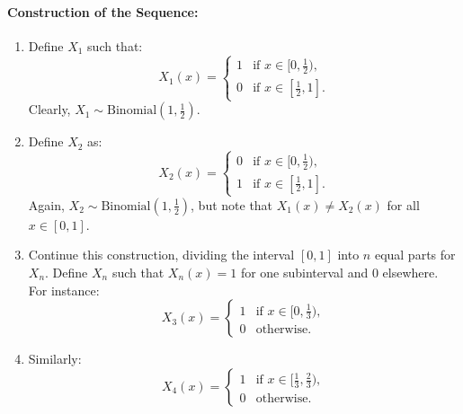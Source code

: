 \paragraph{Construction of the Sequence:}
\begin{enumerate}
    \item Define \( X_1 \) such that:
    \[
    X_1(x) =
    \begin{cases}
    1 & \text{if } x \in [0, \frac{1}{2}), \\
    0 & \text{if } x \in [\frac{1}{2}, 1].
    \end{cases}
    \]
    Clearly, \( X_1 \sim \text{Binomial}(1, \frac{1}{2}) \).
    
    \item Define \( X_2 \) as:
    \[
    X_2(x) =
    \begin{cases}
    0 & \text{if } x \in [0, \frac{1}{2}), \\
    1 & \text{if } x \in [\frac{1}{2}, 1].
    \end{cases}
    \]
    Again, \( X_2 \sim \text{Binomial}(1, \frac{1}{2}) \), but note that \( X_1(x) \neq X_2(x) \) for all \( x \in [0, 1] \).

    \item Continue this construction, dividing the interval \([0, 1]\) into \( n \) equal parts for \( X_n \). Define \( X_n \) such that \( X_n(x) = 1 \) for one subinterval and \( 0 \) elsewhere. For instance:
    \[
    X_3(x) =
    \begin{cases}
    1 & \text{if } x \in [0, \frac{1}{3}), \\
    0 & \text{otherwise}.
    \end{cases}
    \]
    \item Similarly:
    \[
    X_4(x) =
    \begin{cases}
    1 & \text{if } x \in [\frac{1}{3}, \frac{2}{3}), \\
    0 & \text{otherwise}.
    \end{cases}
    \]
\end{enumerate}

